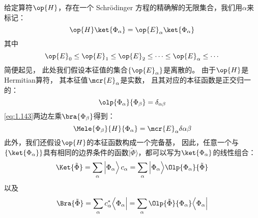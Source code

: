 给定算符$\op{H}$，存在一个 Schr\"odinger 方程的精确解的无限集合，我们用$\alpha$来标记：
\begin{equation}
 \op{H}\ket{\Phi_\alpha} = \op{E}_\alpha\ket{\Phi_\alpha}
 \label{eq:1.143}
\end{equation}
其中
\[
\op{E}_0 \leq \op{E}_1 \leq \op{E}_2 \leq \cdots \leq \op{E}_\alpha \leq \cdots
\]
简便起见，
此处我们假设本征值的集合$\left\{\op{E}_\alpha\right\}$是离散的。
由于$\op{H}$是 Hermitian算符，
其本征值$\mcr{E}_\alpha$是实数，
且其对应的本征函数是正交归一的：
\begin{equation}
 \olp{\Phi_\alpha}{\Phi_\beta} = \delta_{\alpha\beta}
 \label{eq:1.144}
\end{equation}
\autoref{eq:1.143}两边左乘$\bra{\Phi_\beta}$得到：
\begin{equation}
 \Mele{\Phi_\beta}{H}{\Phi_\alpha} = \mcr{E}_\alpha\delta{\alpha\beta}
 \label{eq:1.145}
\end{equation}
此外，我们还假设$\op{H}$的本征函数构成一个完备基，
因此，任意一个与$\left\{\ket{\Phi_\alpha}\right\}$具有相同的边界条件的函数$\vert\tilde{\Phi}\rangle$，都可以写为$\ket{\Phi_\alpha}$的线性组合：
\begin{equation}
 \Ket{\tilde{\Phi}} = \sum_\alpha \mathinner{\Big\vert\Phi_\alpha\Big\rangle} c_\alpha = \sum_\alpha \Big\vert\Phi_\alpha\Big\rangle \Olp{\Phi_\alpha}{\tilde{\Phi}}
 \label{eq:1.146}
\end{equation}
以及
\begin{equation}
 \Bra{\tilde\Phi} = \sum_\alpha c_\alpha^\ast \Big\langle\Phi_\alpha\Big\vert = \sum_\alpha \Olp{\tilde\Phi}{\Phi_\alpha}\Big\langle\Phi_\alpha\Big\vert
 \label{eq:1.147}
\end{equation}


